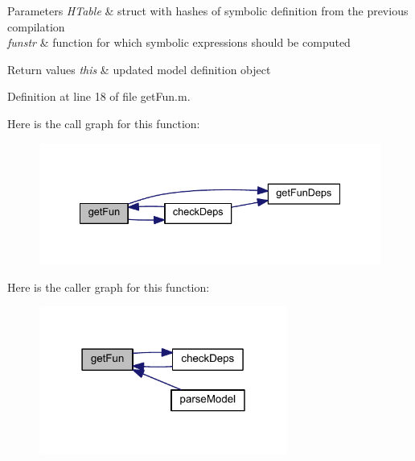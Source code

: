 \begin{DoxyParams}{Parameters}
{\em H\+Table} & struct with hashes of symbolic definition from the previous compilation \\
\hline
{\em funstr} & function for which symbolic expressions should be computed\\
\hline
\end{DoxyParams}

\begin{DoxyRetVals}{Return values}
{\em this} & updated model definition object \\
\hline
\end{DoxyRetVals}


Definition at line 18 of file get\+Fun.\+m.



Here is the call graph for this function\+:\nopagebreak
\begin{figure}[H]
\begin{center}
\leavevmode
\includegraphics[width=335pt]{classamimodel_a73f1b1b08350475e8d854d1a7f1944e1_cgraph}
\end{center}
\end{figure}




Here is the caller graph for this function\+:\nopagebreak
\begin{figure}[H]
\begin{center}
\leavevmode
\includegraphics[width=231pt]{classamimodel_a73f1b1b08350475e8d854d1a7f1944e1_icgraph}
\end{center}
\end{figure}


